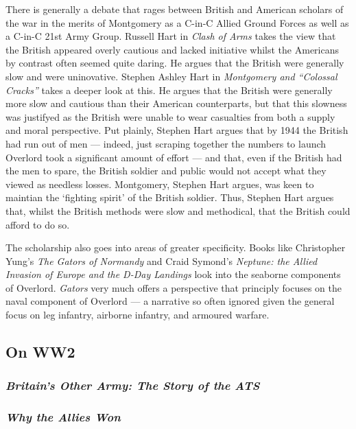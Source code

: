 \documentclass[noraggedright]{turabian-researchpaper}
\begin{document}
There is generally a debate that rages between British and American scholars
of the war in the merits of Montgomery as a C-in-C Allied Ground Forces as
well as a C-in-C 21st Army Group.  Russell Hart in \textit{Clash of Arms} takes
the view that the British appeared overly cautious and lacked initiative whilst 
the Americans by contrast often seemed quite daring.%
He argues that the British were generally slow and
were uninovative.  Stephen Ashley Hart in \textit{Montgomery and ``Colossal
Cracks''} takes a deeper look at this.  He argues that the British were 
generally more slow and cautious than their American counterparts, but that 
this slowness was justifyed as the British were unable to wear casualties from
both a supply and moral perspective.  Put plainly, Stephen Hart argues that by 
1944 the British had run out of men --- indeed, just scraping together the 
numbers to launch Overlord took a significant amount of effort\autocite[56-7]
{cracks}
--- and that, even if the British had the men to spare, the British soldier 
and public would not accept what they 
viewed as needless losses.\autocite[24-5]{cracks}  
Montgomery, Stephen Hart argues, was keen to maintian the `fighting spirit'
of the British soldier.  Thus, Stephen Hart argues that, whilst the British
methods were slow and methodical, that the British could afford to do so.  

The scholarship also goes into areas of greater specificity.  Books like 
Christopher Yung's \textit{The Gators of Normandy} and Craid Symond's 
\textit{Neptune: the Allied Invasion of Europe and the D-Day Landings} 
look into the seaborne components of Overlord.  \textit{Gators} very much
offers a perspective that principly focuses on the naval component of 
Overlord --- a narrative so often ignored given the general focus on 
leg infantry, airborne infantry, and armoured warfare.%

	\subsection{On WW2} %
		\subsubsection{\textit{Britain's Other Army:  The Story of
			the ATS}}
		\subsubsection{\textit{Why the Allies Won}}
\end{document}

